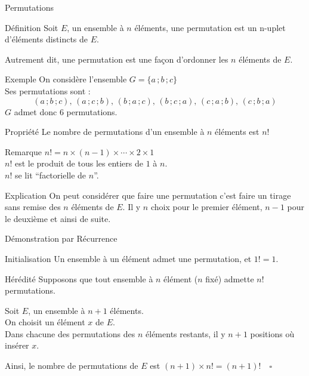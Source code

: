 \documentclass{cours}
\begin{document}
    \begin{Gpartie}{Permutations}
        \begin{Spartie}{Définition}
            Soit $E$, un ensemble à $n$ éléments, une permutation est un n-uplet d'éléments distincts de $E$.

            Autrement dit, une permutation est une façon d'ordonner les $n$ éléments de $E$.
            \begin{SSpartie}{Exemple}
                On considère l'ensemble $G=\big\{a\,;b\,;c\big\}$ \\ Ses permutations sont :
                \[(a\,;b\,;c),\,(a\,;c\,;b),\,(b\,;a\,;c),\,(b\,;c\,;a),\,(c\,;a\,;b),\,(c\,;b\,;a)\]
                $G$ admet donc 6 permutations.
            \end{SSpartie}
        \end{Spartie}
        \begin{Spartie}{Propriété}
            Le nombre de permutations d'un ensemble à $n$ éléments est $n!$
            \begin{SSpartie}{Remarque}
                $n! =n\times(n-1)\times\dotsb\times 2\times 1$ \\
                $n!$ est le produit de tous les entiers de $1$ à $n$. \\
                $n!$ se lit ``factorielle de $n$''.
            \end{SSpartie}
            \begin{SSpartie}{Explication}
                On peut considérer que faire une permutation c'est faire un tirage sans remise des $n$ éléments de $E$. Il y $n$ choix pour le premier élément, $n-1$ pour le deuxième et ainsi de suite.
            \end{SSpartie}
            \pagebreak
            \begin{SSpartie}{Démonstration par Récurrence}
                \begin{SSSpartie}{Initialisation}
                    Un ensemble à un élément admet une permutation, et $1! =1$.
                \end{SSSpartie}
                \begin{SSSpartie}{Hérédité}
                    Supposons que tout ensemble à $n$ élément ($n$ fixé) admette $n!$ permutations.

                    Soit $E$, un ensemble à $n+1$ éléments. \\
                    On choisit un élément $x$ de $E$. \\
                    Dans chacune des permutations des $n$ éléments restants, il y $n+1$ positions où insérer $x$.

                    Ainsi, le nombre de permutations de $E$ est $(n+1)\times n! =(n+1)!\quad\square$
                \end{SSSpartie}
            \end{SSpartie}
        \end{Spartie}
    \end{Gpartie}
\end{document}
